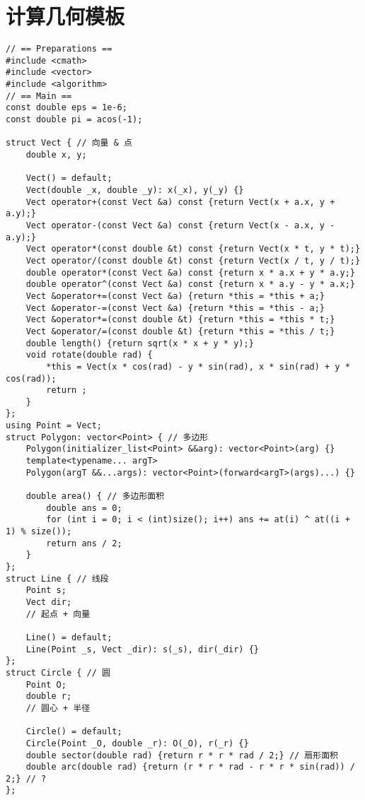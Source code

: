 \section{计算几何模板}

\begin{verbatim}
// == Preparations ==
#include <cmath>
#include <vector>
#include <algorithm>
// == Main ==
const double eps = 1e-6;
const double pi = acos(-1);

struct Vect { // 向量 & 点
    double x, y;

    Vect() = default;
    Vect(double _x, double _y): x(_x), y(_y) {}
    Vect operator+(const Vect &a) const {return Vect(x + a.x, y + a.y);}
    Vect operator-(const Vect &a) const {return Vect(x - a.x, y - a.y);}
    Vect operator*(const double &t) const {return Vect(x * t, y * t);}
    Vect operator/(const double &t) const {return Vect(x / t, y / t);}
    double operator*(const Vect &a) const {return x * a.x + y * a.y;}
    double operator^(const Vect &a) const {return x * a.y - y * a.x;}
    Vect &operator+=(const Vect &a) {return *this = *this + a;}
    Vect &operator-=(const Vect &a) {return *this = *this - a;}
    Vect &operator*=(const double &t) {return *this = *this * t;}
    Vect &operator/=(const double &t) {return *this = *this / t;}
    double length() {return sqrt(x * x + y * y);}
    void rotate(double rad) {
        *this = Vect(x * cos(rad) - y * sin(rad), x * sin(rad) + y * cos(rad));
        return ;
    }
};
using Point = Vect;
struct Polygon: vector<Point> { // 多边形
    Polygon(initializer_list<Point> &&arg): vector<Point>(arg) {}
    template<typename... argT>
    Polygon(argT &&...args): vector<Point>(forward<argT>(args)...) {}

    double area() { // 多边形面积
        double ans = 0;
        for (int i = 0; i < (int)size(); i++) ans += at(i) ^ at((i + 1) % size());
        return ans / 2;
    }
};
struct Line { // 线段
    Point s;
    Vect dir;
    // 起点 + 向量

    Line() = default;
    Line(Point _s, Vect _dir): s(_s), dir(_dir) {}
};
struct Circle { // 圆
    Point O;
    double r;
    // 圆心 + 半径

    Circle() = default;
    Circle(Point _O, double _r): O(_O), r(_r) {}
    double sector(double rad) {return r * r * rad / 2;} // 扇形面积
    double arc(double rad) {return (r * r * rad - r * r * sin(rad)) / 2;} // ?
};


\end{verbatim}
